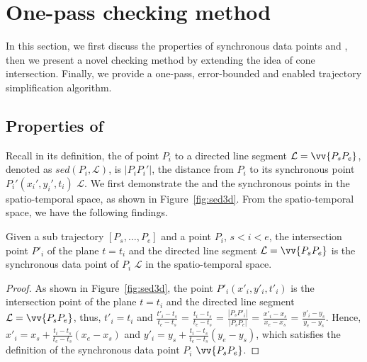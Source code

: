 \section{One-pass \sed checking method}

In this section, we first discuss the properties of synchronous data points and \sed, then we present a novel \sed checking method by extending the idea of cone intersection. 
Finally, we provide a one-pass, error-bounded and \sed enabled trajectory simplification algorithm.



\subsection{Properties of \sed} %
Recall in its definition, the \sed of point $P_i$ to a directed line segment $\mathcal{L} = \vv{P_{s}P_{e}}$, denoted as $sed(P_i, \mathcal{L})$, is $|P_iP_i'|$, the distance from $P_i$ to its synchronous point $P_i' (x_i', y_i', t_i)$ \wrt $\mathcal{L}$.
We first demonstrate the \sed and the synchronous points in the spatio-temporal space, as shown in Figure~\ref{fig:sed3d}.
From the spatio-temporal space, we have the following findings.





\begin{lemma}
\label{prop-3d-syn-point}
Given a sub trajectory $[P_s, \ldots, P_e]$ and a point $P_i$, $s<i<e$, the intersection point $P'_i$ of the plane $t=t_i$ and the directed line segment $\mathcal{L} = \vv{P_sP_e}$ is the synchronous data point of $P_i$ \wrt $\mathcal{L}$ in the spatio-temporal space.
\end{lemma}

\begin{proof}
As shown in Figure~\ref{fig:sed3d}, the point $P'_i (x'_i, y'_i, t'_i)$ is the intersection point of the plane $t=t_i$ and the directed line segment $\mathcal{L} = \vv{P_sP_e}$, thus, $t'_i = t_i$ and $\frac{t'_i - t_s}{t_e - t_s}$ = $\frac{t_i - t_s}{t_e - t_s}$  = $\frac{|P_sP'_i|}{|P_sP_e|}$ = $\frac{x'_i - x_s}{x_e - x_s}$ = $\frac{y'_i - y_s}{y_e - y_s}$. Hence, $x'_i = x_s +  \frac{t_i-t_s}{t_e - t_s}(x_e - x_s)$ and $y'_i = y_s +  \frac{t_i - t_s}{t_e - t_s}(y_e - y_s)$, which satisfies the definition of the synchronous data point $P_i$ \wrt $\vv{P_sP_e}$.
\end{proof}




